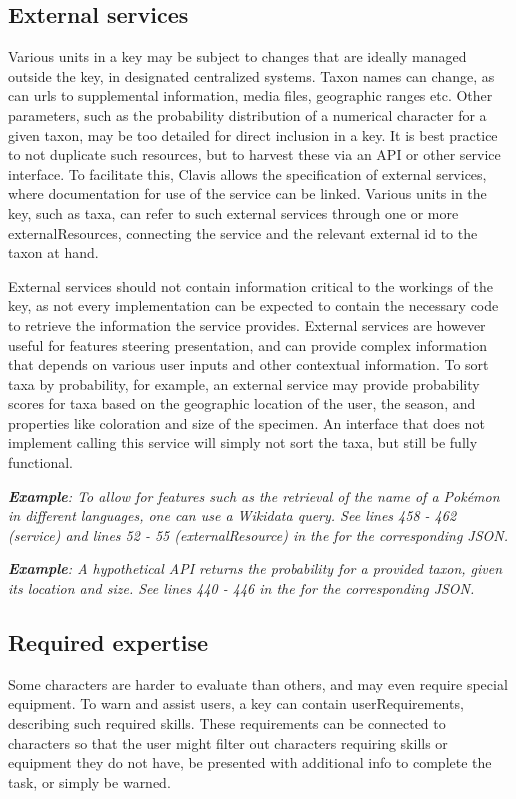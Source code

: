 \documentclass[10pt,letterpaper]{article}
\begin{document}
\subsection*{
External services
}
Various units in a key may be subject to changes that are ideally managed outside the key, in designated centralized systems. Taxon names can change, as can urls to supplemental information, media files, geographic ranges etc. Other parameters, such as the probability distribution of a numerical character for a given taxon, may be too detailed for direct inclusion in a key. It is best practice to not duplicate such resources, but to harvest these via an API or other service interface. To facilitate this, Clavis allows the specification of external services, where documentation for use of the service can be linked. Various units in the key, such as taxa, can refer to such external services through one or more externalResources, connecting the service and the relevant external id to the taxon at hand.

External services should not contain information critical to the workings of the key, as not every implementation can be expected to contain the necessary code to retrieve the information the service provides. External services are however useful for features steering presentation, and can provide complex information that depends on various user inputs and other contextual information. To sort taxa by probability, for example, an external service may provide probability scores for taxa based on the geographic location of the user, the season, and properties like coloration and size of the specimen. An interface that does not implement calling this service will simply not sort the taxa, but still be fully functional.


\textit{\textbf{Example}: To allow for features such as the retrieval of the name of a Pokémon in different languages, one can use a Wikidata query. See lines 458 - 462 (service) and lines 52 - 55 (externalResource) in the  for the corresponding JSON.}


\textit{\textbf{Example}: A hypothetical API returns the probability for a provided taxon, given its location and size. See lines 440 - 446 in the  for the corresponding JSON.}
\subsection*{
Required expertise
}
Some characters are harder to evaluate than others, and may even require special equipment. To warn and assist users, a key can contain userRequirements, describing such required skills. These requirements can be connected to characters so that the user might filter out characters requiring skills or equipment they do not have, be presented with additional info to complete the task, or simply be warned.
\end{document}
